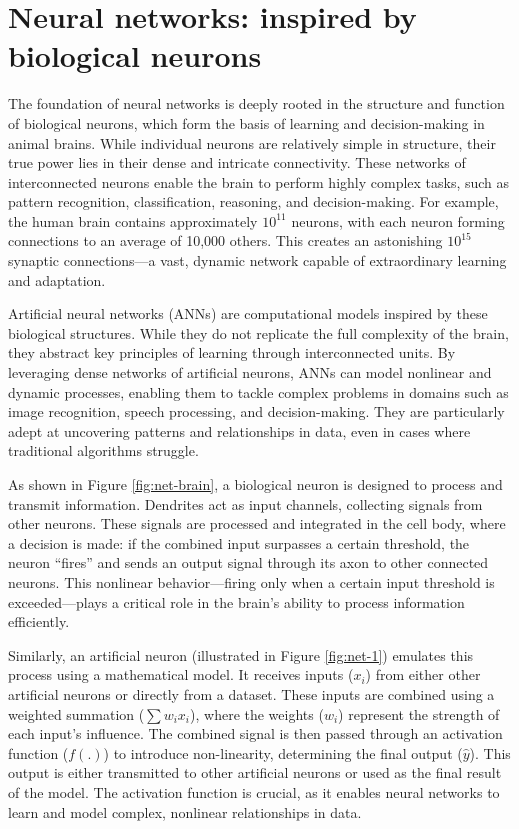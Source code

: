\documentclass[
  11pt,
]{book}
\theoremstyle{definition}
\theoremstyle{definition}
\theoremstyle{definition}
\theoremstyle{definition}
\theoremstyle{remark}
\begin{document}
\section{Neural networks: inspired by biological neurons}\label{neural-networks-inspired-by-biological-neurons}

The foundation of neural networks is deeply rooted in the structure and function of biological neurons, which form the basis of learning and decision-making in animal brains. While individual neurons are relatively simple in structure, their true power lies in their dense and intricate connectivity. These networks of interconnected neurons enable the brain to perform highly complex tasks, such as pattern recognition, classification, reasoning, and decision-making. For example, the human brain contains approximately \(10^{11}\) neurons, with each neuron forming connections to an average of 10,000 others. This creates an astonishing \(10^{15}\) synaptic connections---a vast, dynamic network capable of extraordinary learning and adaptation.

Artificial neural networks (ANNs) are computational models inspired by these biological structures. While they do not replicate the full complexity of the brain, they abstract key principles of learning through interconnected units. By leveraging dense networks of artificial neurons, ANNs can model nonlinear and dynamic processes, enabling them to tackle complex problems in domains such as image recognition, speech processing, and decision-making. They are particularly adept at uncovering patterns and relationships in data, even in cases where traditional algorithms struggle.

As shown in Figure \ref{fig:net-brain}, a biological neuron is designed to process and transmit information. Dendrites act as input channels, collecting signals from other neurons. These signals are processed and integrated in the cell body, where a decision is made: if the combined input surpasses a certain threshold, the neuron ``fires'' and sends an output signal through its axon to other connected neurons. This nonlinear behavior---firing only when a certain input threshold is exceeded---plays a critical role in the brain's ability to process information efficiently.

Similarly, an artificial neuron (illustrated in Figure \ref{fig:net-1}) emulates this process using a mathematical model. It receives inputs (\(x_i\)) from either other artificial neurons or directly from a dataset. These inputs are combined using a weighted summation (\(\sum w_i x_i\)), where the weights (\(w_i\)) represent the strength of each input's influence. The combined signal is then passed through an activation function (\(f(.)\)) to introduce non-linearity, determining the final output (\(\hat{y}\)). This output is either transmitted to other artificial neurons or used as the final result of the model. The activation function is crucial, as it enables neural networks to learn and model complex, nonlinear relationships in data.
\end{document}
